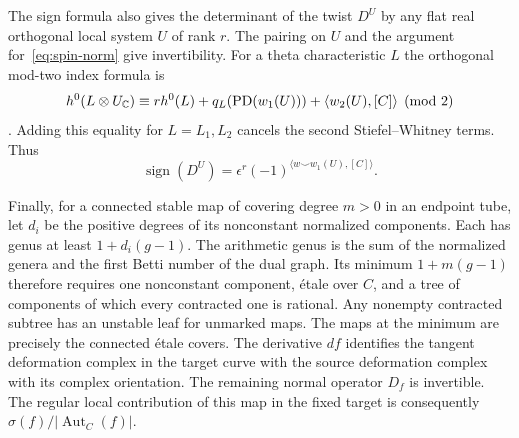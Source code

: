 The sign formula also gives the determinant of the twist $D^U$ by
any flat real orthogonal local system $U$ of rank $r$. The pairing
on $U$ and the argument for~\eqref{eq:spin-norm} give invertibility.
For a theta characteristic $L$ the orthogonal mod-two index formula
is
\[
 h^0(L\otimes U_{\mathbb C})\equiv
 r h^0(L)+q_L(\operatorname{PD}(w_1(U)))
              +\langle w_2(U),[C]\rangle \pmod2
\]
\cite[Lemma~5.8]{bspectral}. Adding this equality for $L=L_1,L_2$
cancels the second Stiefel--Whitney terms. Thus
\begin{equation}\label{eq:spin-twist}
        \operatorname{sign}(D^U)
            =\epsilon^r(-1)^{\langle w\smile w_1(U),[C]\rangle}.
\end{equation}

Finally, for a connected stable map of covering degree $m>0$ in an
endpoint tube, let $d_i$ be the positive degrees of its nonconstant
normalized components. Each has genus at least $1+d_i(g-1)$.
The arithmetic genus is the sum of the normalized genera and the
first Betti number of the dual graph. Its minimum $1+m(g-1)$
therefore requires one nonconstant component, \'etale over $C$,
and a tree of components of which every contracted one is rational.
Any nonempty contracted subtree has an unstable leaf for unmarked
maps. The maps at the minimum are precisely the connected \'etale
covers. The derivative $df$ identifies the tangent deformation
complex in the target curve with the source deformation complex
with its complex orientation. The remaining normal operator $D_f$
is invertible. The regular local contribution of this map in the
fixed target is consequently $\sigma(f)/|\operatorname{Aut}_C(f)|$.
